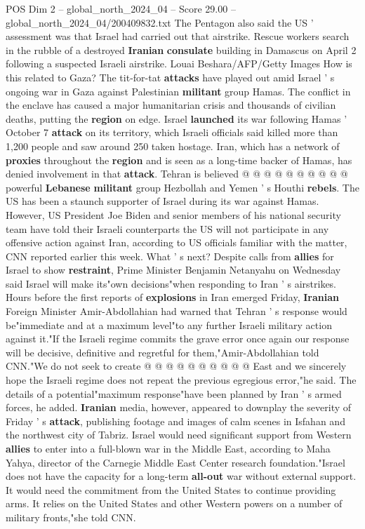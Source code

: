 \begin{textsample}{POS Dim 2 – global\_north\_2024\_04 – Score 29.00 – global\_north\_2024\_04/200409832.txt}
The Pentagon also said the US ' assessment was that Israel had carried out that airstrike.
Rescue workers search in the rubble of a destroyed \textbf{Iranian} \textbf{consulate} building in Damascus on April 2 following a suspected Israeli airstrike.
Louai Beshara/AFP/Getty Images How is this related to Gaza?
The tit-for-tat \textbf{attacks} have played out amid Israel ' s ongoing war in Gaza against Palestinian \textbf{militant} group Hamas.
The conflict in the enclave has caused a major humanitarian crisis and thousands of civilian deaths, putting the \textbf{region} on edge.
Israel \textbf{launched} its war following Hamas ' October 7 \textbf{attack} on its territory, which Israeli officials said killed more than 1,200 people and saw around 250 taken hostage.
Iran, which has a network of \textbf{proxies} throughout the \textbf{region} and is seen as a long-time backer of Hamas, has denied involvement in that \textbf{attack}.
Tehran is believed @ @ @ @ @ @ @ @ @ @ powerful \textbf{Lebanese} \textbf{militant} group Hezbollah and Yemen ' s Houthi \textbf{rebels}.
The US has been a staunch supporter of Israel during its war against Hamas.
However, US President Joe Biden and senior members of his national security team have told their Israeli counterparts the US will not participate in any offensive action against Iran, according to US officials familiar with the matter, CNN reported earlier this week.
What ' s next?
Despite calls from \textbf{allies} for Israel to show \textbf{restraint}, Prime Minister Benjamin Netanyahu on Wednesday said Israel will make its"own decisions"when responding to Iran ' s airstrikes.
Hours before the first reports of \textbf{explosions} in Iran emerged Friday, \textbf{Iranian} Foreign Minister Amir-Abdollahian had warned that Tehran ' s response would be"immediate and at a maximum level"to any further Israeli military action against it."If the Israeli regime commits the grave error once again our response will be decisive, definitive and regretful for them,"Amir-Abdollahian told CNN."We do not seek to create @ @ @ @ @ @ @ @ @ @ East and we sincerely hope the Israeli regime does not repeat the previous egregious error,"he said.
The details of a potential"maximum response"have been planned by Iran ' s armed forces, he added. \textbf{Iranian} media, however, appeared to downplay the severity of Friday ' s \textbf{attack}, publishing footage and images of calm scenes in Isfahan and the northwest city of Tabriz.
Israel would need significant support from Western \textbf{allies} to enter into a full-blown war in the Middle East, according to Maha Yahya, director of the Carnegie Middle East Center research foundation."Israel does not have the capacity for a long-term \textbf{all-out} war without external support.
It would need the commitment from the United States to continue providing arms.
It relies on the United States and other Western powers on a number of military fronts,"she told CNN.

\end{textsample}
